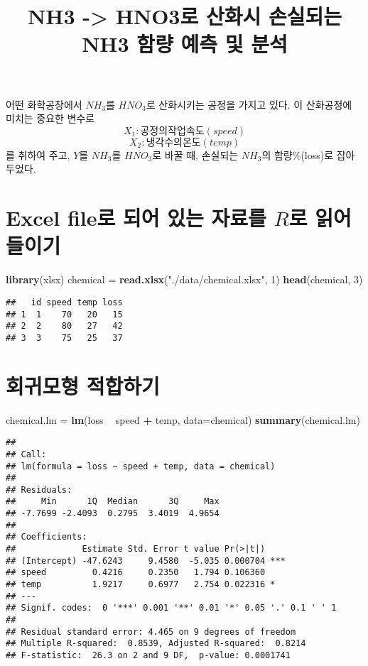 \documentclass[]{article}
\title{NH3 -\textgreater{} HNO3로 산화시 손실되는 NH3 함량 예측 및 분석}
\author{}
\date{}
\newenvironment{Shaded}{\begin{snugshade}}{\end{snugshade}}
\newcommand{\KeywordTok}[1]{\textcolor[rgb]{0.13,0.29,0.53}{\textbf{#1}}}
\newcommand{\DataTypeTok}[1]{\textcolor[rgb]{0.13,0.29,0.53}{#1}}
\newcommand{\DecValTok}[1]{\textcolor[rgb]{0.00,0.00,0.81}{#1}}
\newcommand{\StringTok}[1]{\textcolor[rgb]{0.31,0.60,0.02}{#1}}
\newcommand{\OperatorTok}[1]{\textcolor[rgb]{0.81,0.36,0.00}{\textbf{#1}}}
\newcommand{\NormalTok}[1]{#1}
\begin{document}
\maketitle

어떤 화학공장에서 \(NH_{3}\)를 \(HNO_{3}\)로 산화시키는 공정을 가지고
있다. 이 산화공정에 미치는 중요한 변수로
\[X_1 : 공정의 작업속도 (speed)\] \[X_2 : 냉각수의 온도 (temp)\] 를
취하여 주고, \(Y\)를 \(NH_3\)를 \(HNO_3\)로 바꿀 때, 손실되는 \(NH_3\)의
함량\%(loss)로 잡아두었다.

\section{\texorpdfstring{Excel file로 되어 있는 자료를 \(R\)로 읽어
들이기}{Excel file로 되어 있는 자료를 R로 읽어 들이기}}\label{excel-fileuxb85c-uxb418uxc5b4-uxc788uxb294-uxc790uxb8ccuxb97c-ruxb85c-uxc77duxc5b4-uxb4e4uxc774uxae30}

\begin{Shaded}
\begin{Highlighting}[]
\KeywordTok{library}\NormalTok{(xlsx)}
\NormalTok{chemical =}\StringTok{ }\KeywordTok{read.xlsx}\NormalTok{(}\StringTok{"./data/chemical.xlsx"}\NormalTok{, }\DecValTok{1}\NormalTok{)}
\KeywordTok{head}\NormalTok{(chemical, }\DecValTok{3}\NormalTok{)}
\end{Highlighting}
\end{Shaded}

\begin{verbatim}
##   id speed temp loss
## 1  1    70   20   15
## 2  2    80   27   42
## 3  3    75   25   37
\end{verbatim}

\section{회귀모형
적합하기}\label{uxd68cuxadc0uxbaa8uxd615-uxc801uxd569uxd558uxae30}

\begin{Shaded}
\begin{Highlighting}[]
\NormalTok{chemical.lm =}\StringTok{ }\KeywordTok{lm}\NormalTok{(loss }\OperatorTok{~}\StringTok{ }\NormalTok{speed }\OperatorTok{+}\StringTok{ }\NormalTok{temp, }\DataTypeTok{data=}\NormalTok{chemical)}
\KeywordTok{summary}\NormalTok{(chemical.lm)}
\end{Highlighting}
\end{Shaded}

\begin{verbatim}
## 
## Call:
## lm(formula = loss ~ speed + temp, data = chemical)
## 
## Residuals:
##     Min      1Q  Median      3Q     Max 
## -7.7699 -2.4093  0.2795  3.4019  4.9654 
## 
## Coefficients:
##             Estimate Std. Error t value Pr(>|t|)    
## (Intercept) -47.6243     9.4580  -5.035 0.000704 ***
## speed         0.4216     0.2350   1.794 0.106360    
## temp          1.9217     0.6977   2.754 0.022316 *  
## ---
## Signif. codes:  0 '***' 0.001 '**' 0.01 '*' 0.05 '.' 0.1 ' ' 1
## 
## Residual standard error: 4.465 on 9 degrees of freedom
## Multiple R-squared:  0.8539, Adjusted R-squared:  0.8214 
## F-statistic:  26.3 on 2 and 9 DF,  p-value: 0.0001741
\end{verbatim}
\end{document}
